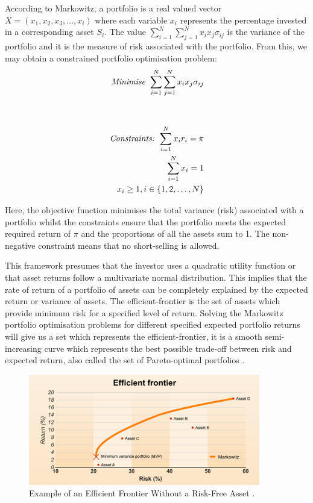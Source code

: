 \documentclass{pdfmx4020}
\begin{document}
    According to Markowitz, a portfolio is a real valued vector $X = (x_1,x_2,x_3, \dots ,x_i)$ where each variable $x_i$ represents the percentage invested in a corresponding asset $S_i$. The value $\sum\limits_{i=1}^N \sum\limits_{j=1}^N x_i x_j \sigma_{ij}$ is the variance of the portfolio and it is the measure of risk associated with the portfolio. From this, we may obtain a constrained portfolio optimisation problem: 
    \begin{equation}
      \begin{split}
        \mbox{\textit{Minimise  }} \sum\limits_{i=1}^N \sum\limits_{j=1}^N x_i x_j \sigma_{ij} \\
        \\\\
        \mbox{\textit{Constraints:} }
        \sum\limits_{i=1}^N x_i r_i = \pi \\
        \sum\limits_{i=1}^N x_i = 1 \\
        x_i \geq 1, i \in \{1,2,\dots,N\}
      \end{split}
    \end{equation}

    Here, the objective function minimises the total variance (risk) associated with a portfolio whilst the constraints ensure that the portfolio meets the expected required return of $\pi$ and the proportions of all the assets sum to 1. The non-negative constraint means that no short-selling is allowed. 

    This framework presumes that the investor uses a quadratic utility function or that asset returns follow a multivariate normal distribution. This implies that the rate of return of a portfolio of assets can be completely explained by the expected return or variance of assets. The efficient-frontier is the set of assets which provide minimum risk for a specified level of return. Solving the Markowitz portfolio optimisation problems for different specified expected portfolio returns will give us a set which represents the efficient-frontier, it is a smooth semi-increasing curve which represents the best possible trade-off between risk and expected return, also called the set of Pareto-optimal portfolios \cite{pareto}. 

    \begin{figure}[H]
      \centering
        \includegraphics[width=0.9\textwidth]{efficient_frontier}
      \caption{Example of an Efficient Frontier Without a Risk-Free Asset \cite{efficient_frontier}.}
      \label{efficient_frontier}
    \end{figure}
\end{document}
